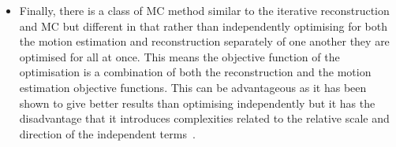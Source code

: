 \begin{itemize}
                \item Finally, there is a class of \gls{MC} method similar to the iterative reconstruction and \gls{MC} but different in that rather than independently optimising for both the motion estimation and reconstruction separately of one another they are optimised for all at once. This means the objective function of the optimisation is a combination of both the reconstruction and the motion estimation objective functions. This can be advantageous as it has been shown to give better results than optimising independently but it has the disadvantage that it introduces complexities related to the relative scale and direction of the independent terms~\parencite{Kalantari2016RespiratorySMEIR}.
            \end{itemize}
    
        
        
            
            
                            
                            
                
                            
                            
                
